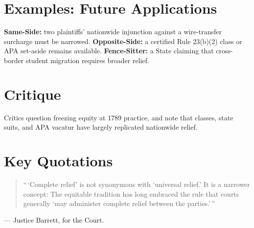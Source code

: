 \documentclass[12pt]{article}
\begin{document}
\section{Examples: Future Applications}
\textbf{Same-Side:} two plaintiffs' nationwide injunction against a wire-transfer surcharge must be narrowed. \textbf{Opposite-Side:} a certified Rule 23(b)(2) class or APA set-aside remains available. \textbf{Fence-Sitter:} a State claiming that cross-border student migration requires broader relief.

\section{Critique}
Critics question freezing equity at 1789 practice, and note that classes, state suits, and APA vacatur have largely replicated nationwide relief.

\section{Key Quotations}
\begin{quote}
``\,`Complete relief' is not synonymous with `universal relief.' It is a narrower concept: The equitable tradition has long embraced the rule that courts generally `may administer complete relief between the parties.'\,''
\end{quote}
\noindent --- Justice Barrett, for the Court.
\end{document}
